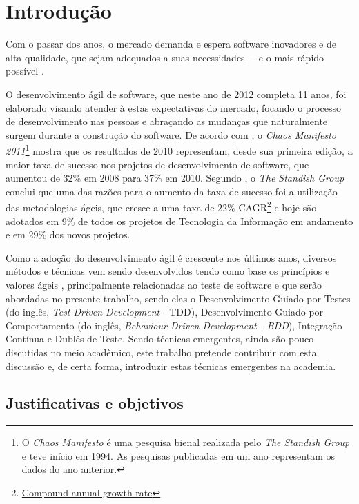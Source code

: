 \chapter{Introdução}

Com o passar dos anos, o mercado demanda e espera software inovadores e de alta qualidade, que sejam adequados a suas necessidades $-$ e o mais rápido possível \cite{TheBusinessOfInnovation}.

O desenvolvimento ágil de software, que neste ano de 2012 completa 11 anos, foi elaborado \cite{AgileManifesto} visando atender à estas expectativas do mercado, focando o processo de desenvolvimento nas pessoas e abraçando as mudanças que  naturalmente surgem durante a construção do software. De acordo com , o \textit{Chaos Manifesto 2011}\footnote{O \textit{Chaos Manifesto} é uma pesquisa bienal realizada pelo \textit{The Standish Group} e teve início em 1994. As pesquisas publicadas em um ano representam os dados do ano anterior.} mostra que os resultados de 2010 representam, desde sua primeira edição, a maior taxa de sucesso nos projetos de desenvolvimento de software, que aumentou de 32\% em 2008 para 37\% em 2010. Segundo , o \textit{The Standish Group} conclui que uma das razões para o aumento da taxa de sucesso foi a utilização das metodologias ágeis, que cresce a uma taxa de 22\% CAGR\footnote{\href{http://en.wikipedia.org/wiki/Compound_annual_growth_rate} {Compound annual growth rate}} e hoje são adotados em 9\% de todos os projetos de Tecnologia da Informação em andamento e em 29\% dos novos projetos.

Como a adoção do desenvolvimento ágil é crescente nos últimos anos, diversos métodos e técnicas vem sendo desenvolvidos tendo como base os princípios e valores ágeis \cite{BDDRodrigo}, principalmente relacionadas ao teste de software e que serão abordadas no presente trabalho, sendo elas o Desenvolvimento Guiado por Testes (do inglês, \textit{Test-Driven Development} - TDD), Desenvolvimento Guiado por Comportamento (do inglês, \textit{Behaviour-Driven Development - BDD}), Integração Contínua e Dublês de Teste. Sendo técnicas emergentes, ainda são pouco discutidas no meio acadêmico, este trabalho pretende contribuir com esta discussão e, de certa forma, introduzir estas técnicas emergentes na academia.


\section{Justificativas e objetivos}

